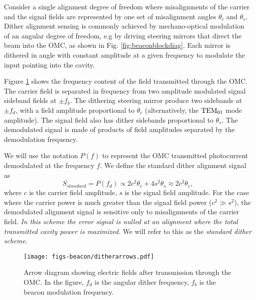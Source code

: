 Consider a single alignment degree of freedom where misalignments of the carrier and the signal fields are represented by one set of misalignment angles $\theta_c$ and $\theta_s$. %
Dither alignment sensing is commonly achieved by mechano-optical modulation of an angular degree of freedom, e.g by driving steering mirrors that direct the beam into the OMC, as shown in Fig. %
\ref{fig:beaconblockdiag}. %
Each mirror is dithered in angle with constant amplitude at a given frequency to modulate the input pointing into the cavity. %


Figure \ref{fig:ditherarrows} shows the frequency content of the field transmitted through the OMC. %
The carrier field is separated in frequency from two amplitude modulated signal sideband fields at $\pm f_b$. %
The dithering steering mirror produce two sidebands at $\pm f_d$, with a field amplitude proportional to $\theta_c$ (alternatively, the ${\rm TEM}_{01}$ mode amplitude\cite{Sigg:00}). %
The signal field also has dither sidebands proportional to $\theta_s$. %
The demodulated signal is made of products of field amplitudes separated by the demodulation frequency.

We will use the notation $P(f)$ to represent the OMC transmitted photocurrent demodulated at the frequency $f$. %
We define the standard dither alignment signal as
%
\begin{equation}
\label{eq:sstandard}
S_{standard} = P(f_d) \propto 2c^2 \theta_c + 4 s^2 \theta_s \approx 2c^2 \theta_c,
\end{equation}
%
where $c$ is the carrier field amplitude, $s$ is the signal field amplitude. %
For the case where the carrier power is much greater than the signal field power ($c^2 \gg s^2$), the demodulated alignment signal is sensitive only to misalignments of the carrier field. %
{\it In this scheme the error signal is nulled at an alignment where the total transmitted cavity power is maximized.} We will refer to this as the {\it standard dither scheme}.

%
\begin{figure}%
  \begin{center}
  \leavevmode
  \texttt{[image: figs-beacon/ditherarrows.pdf]}
  \end{center}
  \caption[Arrow diagram of dither alignment signals.]{Arrow diagram showing electric fields after transmission through the OMC. In the figure, $f_d$ is the angular dither frequency, $f_b$ is the beacon modulation frequency.}
  \label{fig:ditherarrows}
\end{figure}
%

